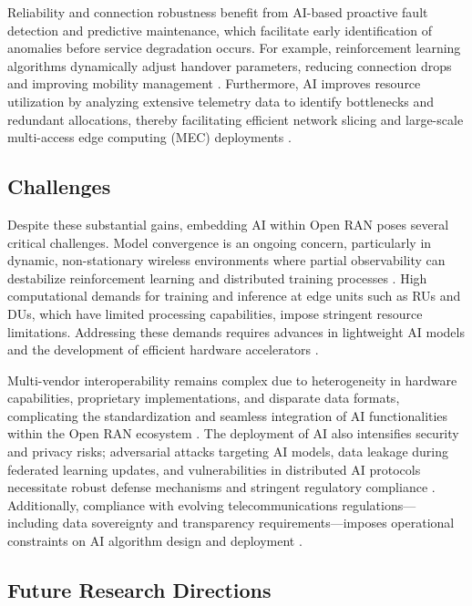 Reliability and connection robustness benefit from AI-based proactive fault detection and predictive maintenance, which facilitate early identification of anomalies before service degradation occurs. For example, reinforcement learning algorithms dynamically adjust handover parameters, reducing connection drops and improving mobility management \cite{ref54}. Furthermore, AI improves resource utilization by analyzing extensive telemetry data to identify bottlenecks and redundant allocations, thereby facilitating efficient network slicing and large-scale multi-access edge computing (MEC) deployments \cite{ref49}.

\subsection{Challenges}

Despite these substantial gains, embedding AI within Open RAN poses several critical challenges. Model convergence is an ongoing concern, particularly in dynamic, non-stationary wireless environments where partial observability can destabilize reinforcement learning and distributed training processes \cite{ref54}. High computational demands for training and inference at edge units such as RUs and DUs, which have limited processing capabilities, impose stringent resource limitations. Addressing these demands requires advances in lightweight AI models and the development of efficient hardware accelerators \cite{ref48}.

Multi-vendor interoperability remains complex due to heterogeneity in hardware capabilities, proprietary implementations, and disparate data formats, complicating the standardization and seamless integration of AI functionalities within the Open RAN ecosystem \cite{ref49}. The deployment of AI also intensifies security and privacy risks; adversarial attacks targeting AI models, data leakage during federated learning updates, and vulnerabilities in distributed AI protocols necessitate robust defense mechanisms and stringent regulatory compliance \cite{ref50}. Additionally, compliance with evolving telecommunications regulations—including data sovereignty and transparency requirements—imposes operational constraints on AI algorithm design and deployment \cite{ref48}.

\subsection{Future Research Directions}

